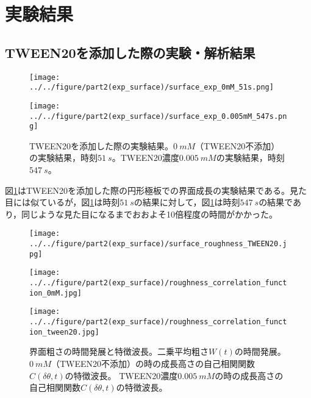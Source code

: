 \documentclass[autodetect-engine,dvi=dvipdfmx,a4paper,ja=standard,oneside,openany,11pt]{bxjsbook}
\begin{document}
\section{実験結果}
\subsection{TWEEN20を添加した際の実験・解析結果}
\begin{figure}[htbp]
  \begin{minipage}
    {0.5\textwidth}
    \subcaption{}
    \centering
    \texttt{[image: ../../figure/part2(exp\_surface)/surface\_exp\_0mM\_51s.png]}
    \label{fig:surface_exp_0mM_51s}
  \end{minipage}
  \begin{minipage}
    {0.5\textwidth}
    \subcaption{}
    \centering
    \texttt{[image: ../../figure/part2(exp\_surface)/surface\_exp\_0.005mM\_547s.png]}
    \label{fig:surface_exp_0.005mM_547s}
  \end{minipage}
  \caption{TWEEN20を添加した際の実験結果。$\SI{0}{mM}$（TWEEN20不添加）の実験結果，時刻$\SI{51}{s}$。TWEEN20濃度$\SI{0.005}{mM}$の実験結果，時刻$\SI{547}{s}$。}
  \label{fig:surface_exp}
\end{figure}
図\ref{fig:surface_exp}はTWEEN20を添加した際の円形極板での界面成長の実験結果である。見た目には似ているが，図\ref{fig:surface_exp}は時刻$\SI{51}{s}$の結果に対して，図\ref{fig:surface_exp}は時刻$\SI{547}{s}$の結果であり，同じような見た目になるまでおおよそ10倍程度の時間がかかった。

\begin{figure}[htbp]
  \begin{minipage}{0.43\textwidth}
    \subcaption{}
    \centering
    \texttt{[image: ../../figure/part2(exp\_surface)/surface\_roughness\_TWEEN20.jpg]}
    \label{fig:surface_roughness_TWEEN20}
  \end{minipage}
  \begin{minipage}{0.29\textwidth}
    \subcaption{}
    \centering
    \texttt{[image: ../../figure/part2(exp\_surface)/roughness\_correlation\_function\_0mM.jpg]}
    \label{fig:roughness_correlation_function_0mM}
  \end{minipage}
  \begin{minipage}{0.26\textwidth}
    \subcaption{}
    \centering
    \texttt{[image: ../../figure/part2(exp\_surface)/roughness\_correlation\_function\_tween20.jpg]}
    \label{fig:roughness_correlation_function_tween20}
  \end{minipage}
  \caption{界面粗さの時間発展と特徴波長。二乗平均粗さ$W(t)$の時間発展。 $\SI{0}{mM}$（TWEEN20不添加）の時の成長高さの自己相関関数$C(\delta\theta,t)$の特徴波長。 TWEEN20濃度$\SI{0.005}{mM}$の時の成長高さの自己相関関数$C(\delta\theta,t)$の特徴波長。}
  \label{fig:surface_roughness}
\end{figure}
\end{document}
